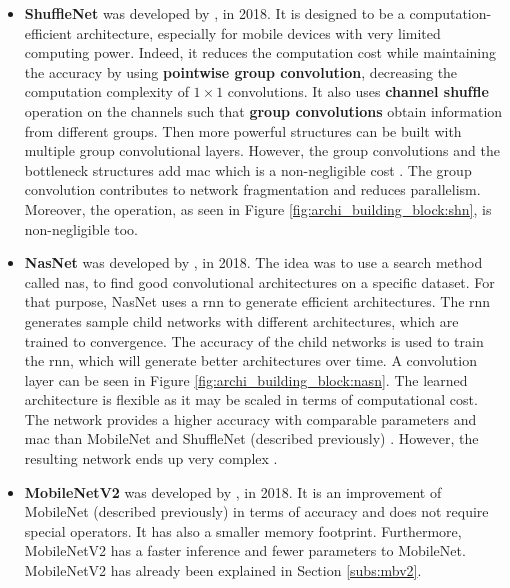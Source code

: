 \begin{itemize}
    \item \textbf{ShuffleNet}  was developed by \textcite{zhang_shufflenet_2018}, in 2018. It is designed to be a computation-efficient architecture, especially for mobile devices with very limited computing power. Indeed, it reduces the computation cost while maintaining the accuracy by using \textbf{pointwise group convolution}, decreasing the computation complexity of $1 \times 1$ convolutions. It also uses \textbf{channel shufﬂe} operation on the channels such that \textbf{group convolutions} obtain information from different groups. Then more powerful structures can be built with multiple group convolutional layers. However, the group convolutions and the bottleneck structures add \acrfull{mac} which is a non-negligible cost \cite{ma_shufflenet_2018}. The group convolution contributes to network fragmentation and reduces parallelism. Moreover, the  operation, as seen in Figure \ref{fig:archi_building_block:shn}, is non-negligible too.
    \item \textbf{NasNet} was developed by \textcite{zoph_learning_2018}, in 2018. The idea was to use a search method called \acrfull{nas}, to find good convolutional architectures on a specific dataset. For that purpose, NasNet uses a \acrfull{rnn} to generate efficient architectures. The \acrshort{rnn} generates sample child networks with different architectures, which are trained to convergence. The accuracy of the child networks is used to train the \acrshort{rnn}, which will generate better architectures over time. A convolution layer can be seen in Figure \ref{fig:archi_building_block:nasn}. The learned architecture is flexible as it may be scaled in terms of computational cost. The network provides a higher accuracy with comparable parameters and \acrshort{mac} than MobileNet and ShuffleNet (described previously) \cite{zoph_learning_2018}. However, the resulting network ends up very complex \cite{sandler_mobilenetv2_2018}.
    \item \textbf{MobileNetV2} was developed by \textcite{sandler_mobilenetv2_2018}, in 2018. It is an improvement of MobileNet (described previously) in terms of accuracy and does not require special operators. It has also a smaller memory footprint. Furthermore, MobileNetV2 has a faster inference and fewer parameters to MobileNet. MobileNetV2 has already been explained in Section \ref{subs:mbv2}.
\end{itemize}
%
